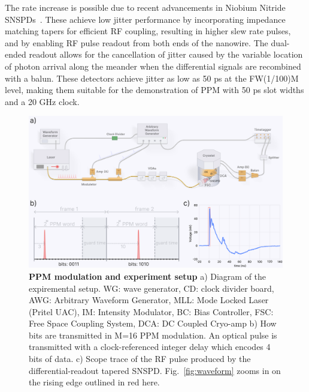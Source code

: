 \documentclass[11pt]{caltech_thesis} %
\begin{document}
The rate increase is possible due to recent advancements in Niobium Nitride SNSPDs~\autocite{Colangelo2023}. These achieve low jitter performance by incorporating impedance matching tapers for efficient RF coupling, resulting in higher slew rate pulses, and by enabling RF pulse readout from both ends of the nanowire. The dual-ended readout allows for the cancellation of jitter caused by the variable location of photon arrival along the meander when the differential signals are recombined with a balun. These detectors achieve jitter as low as 50 ps at the FW(1/100)M level, making them suitable for the demonstration of PPM with 50 ps slot widths and a 20 GHz clock.

\hypertarget{fig:intro}{%
\begin{figure}
\centering
\includegraphics[width=1\textwidth,height=\textheight]{./chapter_04/figs/fig_intro_2_light.png}
\caption[{PPM modulation and experiment setup}]{\textbf{PPM modulation and experiment setup} a) Diagram of the expiremental setup. WG: wave generator, CD: clock divider board, AWG: Arbitrary Waveform Generator, MLL: Mode Locked Laser (Pritel UAC), IM: Intensity Modulator, BC: Bias Controller, FSC: Free Space Coupling System, DCA: DC Coupled Cryo-amp b) How bits are transmitted in M=16 PPM modulation. An optical pulse is transmitted with a clock-referenced integer delay which encodes 4 bits of data. c) Scope trace of the RF pulse produced by the differential-readout tapered SNSPD. Fig.~\ref{fig:waveform} zooms in on the rising edge outlined in red here.}
\label{fig:intro}
\end{figure}
}
\end{document}
